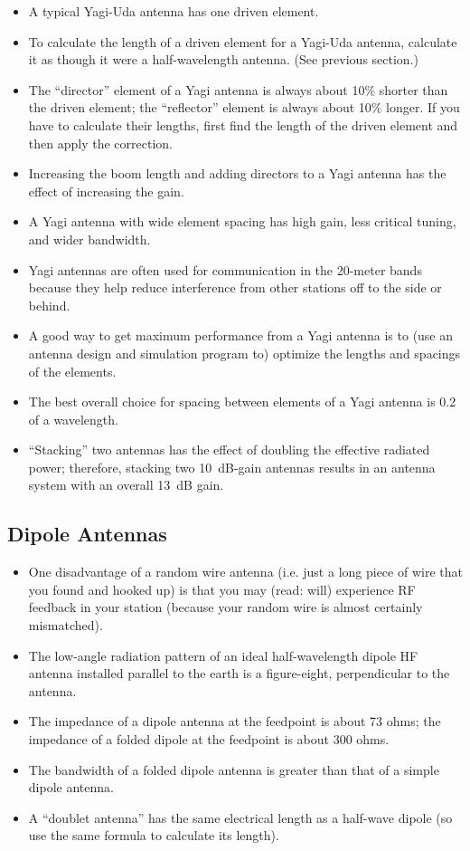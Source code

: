 \documentclass[letterpaper,12pt]{article}
\begin{document}
\begin{itemize}
\item A typical Yagi-Uda antenna has one driven element.
\item To calculate the length of a driven element for a Yagi-Uda antenna, calculate it as though it were a half-wavelength antenna. (See previous section.)
\item The ``director'' element of a Yagi antenna is always about 10\% shorter than the driven element; the ``reflector'' element
is always about 10\% longer. If you have to calculate their lengths, first find the length of the driven element and then apply the correction.
\item Increasing the boom length and adding directors to a Yagi antenna has the effect of increasing the gain.
\item A Yagi antenna with wide element spacing has high gain, less critical tuning, and wider bandwidth.
\item Yagi antennas are often used for communication in the 20-meter bands because they help reduce interference from other stations off to the side or behind.
\item A good way to get maximum performance from a Yagi antenna is to (use an antenna design and simulation program to) optimize the lengths and spacings of the elements.
\item The best overall choice for spacing between elements of a Yagi antenna is 0.2 of a wavelength.
\item ``Stacking'' two antennas has the effect of doubling the effective radiated power; therefore, stacking two 10~dB-gain antennas
results in an antenna system with an overall 13~dB gain.
\end{itemize}

\subsection{Dipole Antennas}

\begin{itemize}
\item One disadvantage of a random wire antenna (i.e. just a long piece of wire that you found and hooked up)
is that you may (read: will) experience RF feedback in your station (because your random wire is almost certainly mismatched).
\item The low-angle radiation pattern of an ideal half-wavelength dipole HF antenna installed parallel to the earth is a figure-eight, perpendicular to the antenna.
\item The impedance of a dipole antenna at the feedpoint is about 73 ohms; the impedance of a folded dipole at the feedpoint is about 300 ohms.
\item The bandwidth of a folded dipole antenna is greater than that of a simple dipole antenna.
\item A ``doublet antenna'' has the same electrical length as a half-wave dipole (so use the same formula to calculate its length).
\end{itemize}
\end{document}
